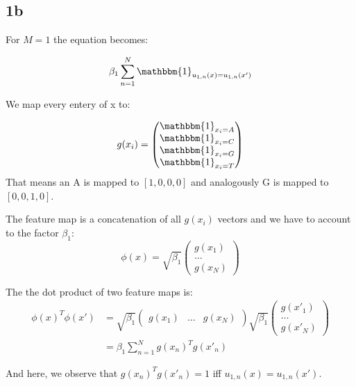 
\subsection*{1b}

For $M=1$ the equation becomes:

\begin{equation}
    \beta_1 \sum_{n=1}^{N} \mathbbm{1}_{u_{1,n}(x) = u_{1,n}(x')}
\end{equation}

We map every entery of x to:

\begin{equation}
g(x_i) = \begin{pmatrix}
    \mathbbm{1}_{x_i = A} \\
    \mathbbm{1}_{x_i = C} \\
    \mathbbm{1}_{x_i = G} \\
    \mathbbm{1}_{x_i = T}
\end{pmatrix}
\end{equation}
That means an A is mapped to $[1, 0, 0, 0]$ and analogously G is mapped to $[0, 0, 1, 0]$.

The feature map is a concatenation of all $g(x_i)$ vectors and we have to account
to the factor $\beta_1$:
\begin{equation}
\phi(x) = \sqrt{\beta_1} \begin{pmatrix}
    g(x_1) \\
    \ldots \\
    g(x_N)
\end{pmatrix}
\end{equation}

The the dot product of two feature maps is:
\begin{align}
    \phi(x)^T \phi(x') &=
       \sqrt{\beta_1} \begin{pmatrix} g(x_1) & \ldots & g(x_N) \end{pmatrix}
       \sqrt{\beta_1}
       \begin{pmatrix}
            g(x'_1) \\
            \ldots \\
            g(x'_N)
       \end{pmatrix} \\
       & = \beta_1 \sum_{n=1}^{N} g(x_n)^T  g(x'_n)
\end{align}

And here, we observe that $g(x_n)^T g(x'_n) = 1$ iff $u_{1,n}(x) = u_{1,n}(x')$.
